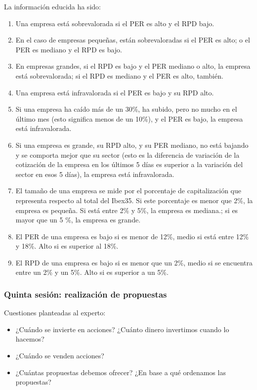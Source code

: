 \documentclass[a4paper,11pt]{article}
\begin{document}
La información educida ha sido: 
\begin{enumerate}[$\rightarrow$]
 \item Una empresa está sobrevalorada si el PER es alto y el RPD bajo.
 \item En el caso de empresas pequeñas, están sobrevaloradas si el PER es alto; o el PER es mediano y el RPD es bajo.
 \item En empresas grandes, si el RPD es bajo y el PER mediano o alto, la empresa está sobrevalorada; si el RPD es mediano
 y el PER es alto, también.
 \item Una empresa está infravalorada si el PER es bajo y su RPD alto.
 \item Si una empresa ha caído más de un 30\%, ha subido, pero no mucho en el último mes (esto significa menos de un 10\%),
 y el PER es bajo, la empresa está infravalorada.
 \item Si una empresa es grande, su RPD alto, y su PER mediano, no está bajando y se comporta mejor que su sector (esto es
 la diferencia de variación de la cotización de la empresa en los últimos 5 días es superior a la variación del sector en 
 esos 5 días), la empresa está infravalorada.
 \item El tamaño de una empresa se mide por el porcentaje de capitalización que representa respecto al total del Ibex35. Si
 este porcentaje es menor que 2\%, la empresa es pequeña. Si está entre 2\% y 5\%, la empresa es mediana.; si es mayor que 
 un 5 \%, la empresa es grande.
 \item El PER de una empresa es bajo si es menor de 12\%, medio si está entre 12\% y 18\%. Alto si es superior al 18\%.
 \item El RPD de una empresa es bajo si es menor que un 2\%, medio si se encuentra entre un 2\% y un 5\%. Alto si es superior
 a un 5\%.
\end{enumerate}

\subsubsection{Quinta sesión: realización de propuestas}

Cuestiones planteadas al experto:
\begin{itemize}
 \item ¿Cuándo se invierte en acciones? ¿Cuánto dinero invertimos cuando lo hacemos?
 \item ¿Cuándo se venden acciones?
 \item ¿Cuántas propuestas debemos ofrecer? ¿En base a qué ordenamos las propuestas?
\end{itemize} 
\end{document}
